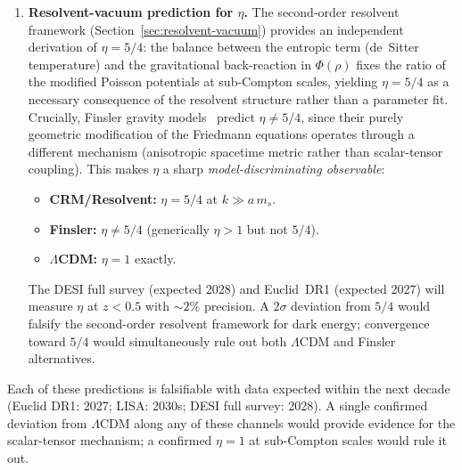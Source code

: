 \documentclass[12pt,a4paper]{article}
\theoremstyle{definition}
\theoremstyle{plain}
\theoremstyle{remark}
\begin{document}
\begin{enumerate}
  \item \textbf{Resolvent-vacuum prediction for $\eta$.}\;
        The second-order resolvent framework
        (Section~\ref{sec:resolvent-vacuum}) provides an independent
        derivation of $\eta = 5/4$: the balance between the entropic
        term (de~Sitter temperature) and the gravitational back-reaction
        in $\Phi(\rho)$ fixes the ratio of the modified Poisson
        potentials at sub-Compton scales, yielding $\eta = 5/4$
        as a necessary consequence of the resolvent structure rather than
        a parameter fit. Crucially, Finsler gravity
        models~\cite{FinslerJCAP2025} predict $\eta \neq 5/4$, since
        their purely geometric modification of the Friedmann equations
        operates through a different mechanism (anisotropic spacetime
        metric rather than scalar-tensor coupling). This makes $\eta$ a
        sharp \emph{model-discriminating observable}:
        \begin{itemize}
          \item \textbf{CRM/Resolvent:} $\eta = 5/4$ at $k \gg a\,m_s$.
          \item \textbf{Finsler:} $\eta \neq 5/4$ (generically $\eta > 1$
                but not $5/4$).
          \item \textbf{$\Lambda$CDM:} $\eta = 1$ exactly.
        \end{itemize}
        The DESI full survey (expected 2028) and Euclid~DR1 (expected
        2027) will measure $\eta$ at $z < 0.5$ with
        $\sim 2\%$ precision. A $2\sigma$ deviation from $5/4$ would
        falsify the second-order resolvent framework for dark energy;
        convergence toward $5/4$ would simultaneously rule out both
        $\Lambda$CDM and Finsler alternatives.
\end{enumerate}

Each of these predictions is falsifiable with data expected within the
next decade (Euclid DR1: 2027; LISA: 2030s; DESI full survey: 2028).
A single confirmed deviation from $\Lambda$CDM along any of these
channels would provide evidence for the scalar-tensor mechanism; a
confirmed $\eta = 1$ at sub-Compton scales would rule it out.
\end{document}
